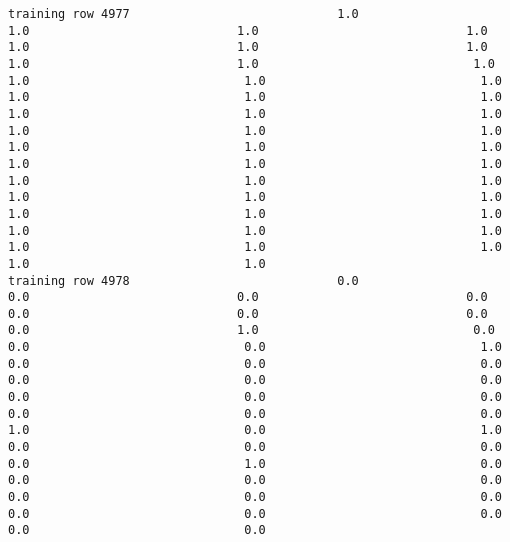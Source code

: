 \documentclass[11pt]{article}
\begin{document}
\begin{verbatim}
training row 4977                             1.0                             1.0                             1.0                             1.0                             1.0                             1.0                             1.0                             1.0                             1.0                              1.0                              1.0                              1.0                              1.0                              1.0                              1.0                              1.0                              1.0                              1.0                              1.0                              1.0                              1.0                              1.0                              1.0                              1.0                              1.0                              1.0                              1.0                              1.0                              1.0                              1.0                              1.0                              1.0                              1.0                              1.0                              1.0                              1.0                              1.0                              1.0                              1.0                              1.0                              1.0                              1.0                              1.0                              1.0                              1.0
training row 4978                             0.0                             0.0                             0.0                             0.0                             0.0                             0.0                             0.0                             0.0                             1.0                              0.0                              0.0                              0.0                              1.0                              0.0                              0.0                              0.0                              0.0                              0.0                              0.0                              0.0                              0.0                              0.0                              0.0                              0.0                              0.0                              1.0                              0.0                              1.0                              0.0                              0.0                              0.0                              0.0                              1.0                              0.0                              0.0                              0.0                              0.0                              0.0                              0.0                              0.0                              0.0                              0.0                              0.0                              0.0                              0.0

\end{verbatim}
\end{document}
